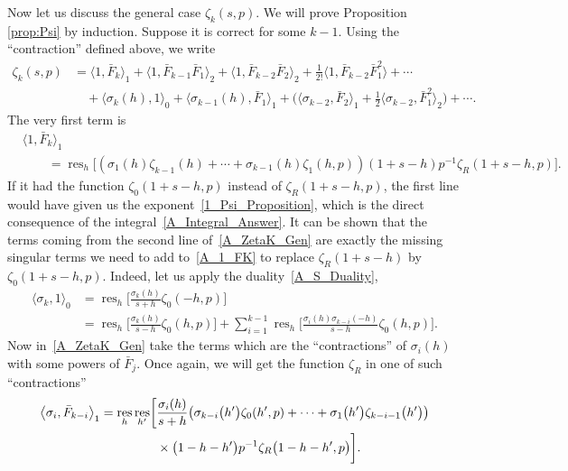 \documentclass[pdftex]{sigma}
\numberwithin{equation}{section}
\DeclareMathOperator{\res}{res}
\begin{document}
Now let us discuss the general case $\zeta_k(s, p)$. We will prove Proposition \ref{prop:Psi} by induction. Suppose it is correct for some $k-1$. Using the ``contraction'' defined above, we write
\begin{align}
\zeta_k(s, p)&= \bigl\langle 1, \bar{F}_{k} \bigr\rangle_1 + \bigl\langle 1, \bar{F}_{k-1} \bar{F}_1 \bigr\rangle_2 + \bigl\langle 1, \bar{F}_{k-2} \bar{F}_{2} \bigr\rangle_2 + \frac{1}{2!} \bigl\langle 1, \bar{F}_{k-2}\bar{F}_1^2\bigr\rangle + \cdots \nonumber\\
             &\quad{}+ \langle \sigma_k(h), 1 \rangle_0
              + \bigl\langle \sigma_{k-1}(h), \bar{F}_1 \bigr\rangle_1
              + \biggl( \bigl\langle \sigma_{k-2}, \bar{F}_2\bigr\rangle_1 + \frac{1}{2}\bigl\langle \sigma_{k-2}, \bar{F}_1^2 \bigr\rangle_2 \biggr)+ \cdots .\label{A_ZetaK_Gen}
\end{align}
The very first term is
\begin{align}
&\bigl\langle 1, \bar{F}_{k} \bigr\rangle_1 \nonumber\\
&\qquad{}= \res_h \bigl[ (\sigma_1(h)\zeta_{k-1}(h)+\cdots+\sigma_{k-1}(h)\zeta_1(h, p))(1+s-h) p^{-1} \zeta_R(1+s-h, p) \bigr].\label{A_1_FK}
\end{align}
If it had the function $\zeta_0(1+s-h, p)$ instead of $\zeta_R(1+s-h, p)$, the first line would have given us the exponent~\eqref{1_Psi_Proposition}, which is the direct consequence of the integral~\eqref{A_Integral_Answer}. It can be shown that the terms coming from the second line of~\eqref{A_ZetaK_Gen} are exactly the missing singular terms we need to add to~\eqref{A_1_FK} to replace $\zeta_R(1+s-h)$ by $\zeta_0(1+s-h, p)$. Indeed, let us apply the duality~\eqref{A_S_Duality},
\begin{align}
\langle \sigma_k, 1 \rangle_0 &{}= \res_h \biggl[ \frac{\sigma_k(h)}{s+h} \zeta_0(-h, p)\biggr] \nonumber\\
                                 &{}= \res_h \biggl[ \frac{\sigma_k(h)}{s-h} \zeta_0(h, p)\biggr] + \sum_{i=1}^{k-1} \res_h \biggl[ \frac{\sigma_i(h) \sigma_{k-i}(-h)}{s-h} \zeta_0(h, p)\biggr].\label{A_S_Duality_Gen}
\end{align}
Now in~\eqref{A_ZetaK_Gen} take the terms which are the ``contractions'' of $\sigma_i(h)$ with some powers of $\bar{F}_j$. Once again, we will get the function $\zeta_R$ in one of such ``contractions''
\begin{align*}
\begin{split}
&\bigl\langle \sigma_i, \bar{F}_{k-i} \bigr\rangle_1=\res_h\res_{h'} \biggl[ \frac{\sigma_i(h)}{s+h}\bigl(\sigma_{k-i}\bigl(h'\bigr)\zeta_0(h', p) + \cdots+ \sigma_1\bigl(h'\bigr)\zeta_{k-i-1}\bigl(h'\bigr)\bigr)\\
&\hphantom{\bigl\langle \sigma_i, \bar{F}_{k-i} \bigr\rangle_1=\res_h\res_{h'} \biggl[}{}
\times\bigl(1-h-h'\bigr)p^{-1} \zeta_R\bigl(1-h-h', p\bigr) \biggr].
\end{split}
\end{align*}
\end{document}
